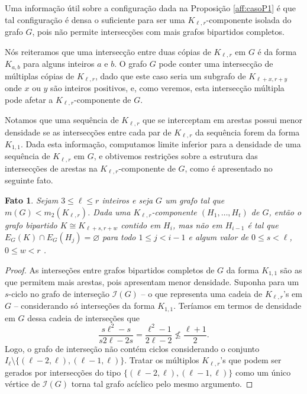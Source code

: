 \documentclass[11pt,twoside,a4paper]{book}
\newcommand{\K}{K_{\ell,r}} %
\newtheorem{fato}      [teorema] {Fato}
\theoremstyle{note}
\begin{document}
     Uma informação útil sobre a configuração dada na Proposição \ref{aff:casoP1} 
     é que tal configuração é densa o suficiente para ser uma $\K$-componente isolada do grafo $G$, pois não permite intersecções com mais grafos bipartidos completos.
     
     Nós reiteramos que uma intersecção entre duas cópias de $\K$ em $G$ é da forma $K_{a,b}$ para alguns inteiros $a$ e $b$. 
	 O grafo $G$ pode conter uma intersecção de múltiplas cópias de
    $\K$, dado que este caso seria um subgrafo de $K_{\ell+x,r+y}$ onde $x$ ou $y$ são inteiros positivos, e, como veremos, esta intersecção múltipla pode afetar a $\K$-componente de $G$. 
    
    Notamos que uma sequência de $\K$ que se interceptam em arestas possui menor densidade se as intersecções entre cada par de $\K$ da sequência forem da forma $K_{1,1}$. 
     Dada esta informação, computamos limite inferior para a densidade de uma sequência de $\K$ em $G$, e obtivemos restrições sobre a estrutura das intersecções de arestas na $\K$-componente de $G$, como é apresentado no seguinte fato.
     
      \begin{fato}\label{fato:ciclos}
        Sejam $3\leq \ell \leq r$ inteiros e seja $G$ um grafo tal que $m(G) < m_2(\K)$.  
        Dada uma $\K$-componente $(H_1, \ldots, H_t)$ de $G$, 
        então o grafo bipartido $K \cong K_{\ell+s, r+w}$ contido em $H_i$, mas não em $H_{i-1}$ é tal que 
        $E_G(K) \cap E_G(H_j) = \varnothing$
        para todo $1 \leq j < i-1$ e algum valor de $0\leq s < \ell$, $0\leq w < r$ .  
  \end{fato}
\begin{proof}
        As interseções entre grafos bipartidos completos de $G$ da forma $K_{1,1}$ são as que permitem mais arestas, pois apresentam menor densidade. 
        Suponha para um $s$-ciclo no grafo de interseção $\mathcal{I}(G)$ -- o que representa uma cadeia de $\K$'s em $G$ --  considerando só interseções da forma $K_{1,1}$.
        Teríamos em termos de densidade em $G$ dessa cadeia de interseções que
        \[
            \frac{s\ell^2 - s}{s2\ell - 2s} =  \frac{\ell^2 - 1}{2\ell - 2}
            \not\leq \frac{\ell+1}{2}. 
        \]
        Logo, o grafo de interseção não contém ciclos considerando o conjunto $I_\ell \setminus \{(\ell-2,\ell), (\ell-1,\ell)\}$.
       Tratar os múltiplos $\K$'s que podem ser gerados por intersecções do tipo $\{(\ell-2,\ell), (\ell-1,\ell)\}$ como um único vértice de $\mathcal{I}(G)$ torna tal grafo acíclico pelo mesmo argumento.
\end{proof}
\end{document}
